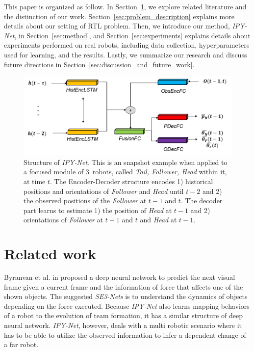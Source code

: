 \documentclass[letterpaper, 10 pt, conference]{ieeeconf}  %
\begin{document}
	This paper is organized as follow. 
	In Section~\ref{sec:related_work}, we explore related literature and the distinction of our work. 
	Section~\ref{sec:problem_description} explains more details about our setting of RTL problem. 
	Then, we introduce our method, \emph{IPY-Net}, in Section~\ref{sec:method}, and 
	Section~\ref{sec:experiments} explains details about experiments performed on real robots, 
	including data collection, hyperparameters used for learning, and the results. 
	Lastly, we summarize our research and discuss future directions 
	in Section~\ref{sec:discussion_and_future_work}.

	\begin{figure}\centering
		\includegraphics[width=1.\columnwidth]{fig_DL_Pipeline}
		\caption{Structure of \emph{IPY-Net}. This is an snapshot example when applied to a focused module of
			$3$~robots, called \emph{Tail, Follower, Head} within it, at time $t$. 
			The Encoder-Decoder structure encodes
			1) historical positions and orientations of \emph{Follower} and \emph{Head} 
			until $t-2$ and 2) the observed positions of the \emph{Follower} at $t-1$ and $t$. 
			The decoder part learns to estimate 1) the position of \emph{Head} at $t-1$ and 
			2) orientations of \emph{Follower} at $t-1$ and $t$ and \emph{Head} at $t-1$.   
		}
		\label{fig:DL_Pipeline}
	\end{figure}
	
	
	\section{Related work}
	\label{sec:related_work}
	
	Byranvan et al. in \cite{Byravan17} proposed a deep neural network to predict the next visual 
	frame given a current frame and the information of force that affects one of the shown objects.
	The suggested \emph{SE3-Nets} is to understand the dynamics of 
	objects depending on the force executed. Because \emph{IPY-Net} also learns mapping 
	behaviors of a robot to the evolution of team formation, it has a similar structure of 
	deep neural network. \emph{IPY-Net}, however, deals with a multi robotic scenario where  
	it has to be able to utilize the observed information to infer a dependent change of 
	a far robot.  
	
\end{document}
